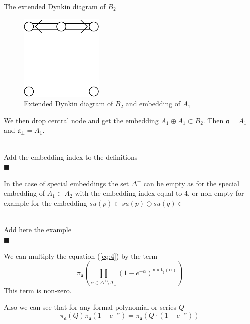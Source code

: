 \documentclass[a4paper,12pt]{article}
\theoremstyle{definition} \newtheorem{Def}{Definition}
\newenvironment{comment}
{\par\noindent{\bf TODO}\\}
{\\\hfill$\scriptstyle\blacksquare$\par}
\begin{document}
The extended Dynkin diagram of $B_2$ 
\begin{figure}[ph]
  \centering
  \includegraphics[width=40mm]{B2_A1_diagram.pdf}
  \caption{Extended Dynkin diagram of $B_2$ and embedding of $A_1$}
  \label{fig:B2Dynkin}
\end{figure}
We then drop central node and get the embedding $A_1\oplus A_1\subset B_2$. Then $\mathfrak{a}=A_1$ and $\mathfrak{a}_{\bot}=A_1$.
\begin{comment}
  Add the embedding index to the definitions
\end{comment}
In the case of special embeddings the set $\Delta^{+}_{\bot}$ can be empty as for the special embedding of $A_1\subset A_2$ with the embedding index equal to 4, or non-empty for example for the embedding $su(p)\subset su(p)\oplus su(q)\subset $
\begin{comment}
  Add here the example
\end{comment}


We can multiply the equation (\ref{eq:4}) by the term
\begin{equation}
  \label{eq:5}
  \pi_{\mathfrak{a}}\left(\prod_{\alpha\in \Delta^{+}\setminus \Delta^{+}_{\bot}}(1-e^{-\alpha})^{\mathrm{mult}_{\mathfrak{g}}(\alpha)} \right)
\end{equation}
This term is non-zero. 

Also we can see that for any formal polynomial or series $Q$
\begin{equation}
  \label{eq:6}
  \pi_{\mathfrak{a}} (Q) \pi_{\mathfrak{a}}(1-e^{-\alpha})=\pi_{\mathfrak{a}}\left(Q\cdot (1-e^{-\alpha})\right)
\end{equation}
\end{document}
